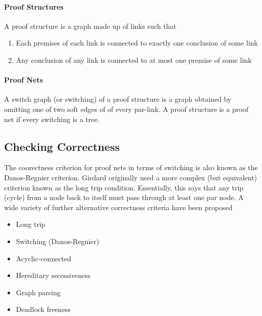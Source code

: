 \paragraph{Proof Structures}  A proof structure is a graph made up of links
such that
\begin{enumerate}
\item Each premises of each link is connected to exactly one conclusion of some
link
\item Any conclusion of any link is connected to at most one premise of some link
\end{enumerate}
 

\paragraph{Proof Nets}  A switch graph (or switching) of a proof structure is
a graph obtained by omitting one of two soft edges of of every par-link.
A proof structure is a proof net if every switching is a tree.


\subsection{Checking Correctness}
The coorectness criterion for proof nets in terms of switching is also known 
as the Danos-Regnier criterion.  Girdard originally used a more complex (but 
equivalent) criterion known as the long trip condition.   Essentially, this says
that any trip (cycle) from a node back to itself must pass through at least
one par node.  A wide variety of further alternative correctness criteria
have been proposed
\begin{itemize}
\item Long trip
\item Switching (Danos-Regnier)
\item Acyclic-connected
\item Hereditary  secessiveness
\item Graph parsing
\item Deadlock freeness
\end{itemize}

